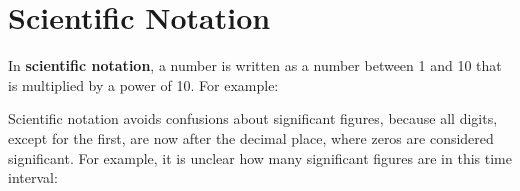 %
%
%

%
%
%
%
\section{Scientific Notation}
In \textbf{scientific notation}, a number is written as a number between
1 and 10 that is multiplied by a power of 10. For example:
%
%
%

%
%
%
Scientific notation avoids confusions about significant figures, because all
digits, except for the first, are now after the decimal place, where zeros are
considered significant. For example, it is unclear how many significant
figures are in this time interval:
%
%  
%  

